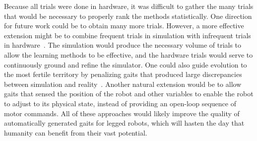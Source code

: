 
Because all trials were done in hardware, it was difficult to gather
the many trials that would be necessary to properly rank the methods statistically.
One direction for future work could be to obtain many more trials. However, a more effective extension might be to combine frequent trials in
simulation with infrequent trials in hardware~\cite{bongard}.  The simulation would produce the
necessary volume of trials to allow the learning methods to be
effective, and the hardware trials would serve to continuously ground
and refine the simulator.  One could also guide evolution to the most
fertile territory by penalizing gaits that produced large
discrepancies between simulation and reality~\cite{koos2010crossing}. Another natural extension would be to allow gaits that sensed the position of the robot and other variables to enable the robot to adjust to its physical state, instead of providing an open-loop sequence of motor commands. All of these approaches would likely improve the quality of automatically generated gaits for legged robots, which will hasten the day that humanity can benefit from their vast potential. 

